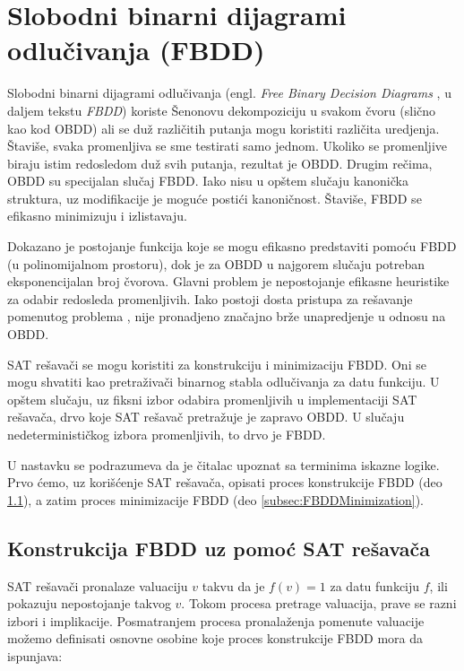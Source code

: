 \section{Slobodni binarni dijagrami odlu\v{c}ivanja (FBDD)}
\label{sec:FBDD}

Slobodni binarni dijagrami odlu\v{c}ivanja (engl. \emph{Free Binary Decision Diagrams} \cite{FBDD}, u daljem tekstu \emph{FBDD}) koriste \v{S}enonovu dekompoziciju u svakom \v{c}voru (sli\v{c}no kao kod OBDD) ali se du\v{z} razli\v{c}itih putanja mogu koristiti razli\v{c}ita uredjenja. \v{S}tavi\v{s}e, svaka promenljiva se sme testirati samo jednom. Ukoliko se promenljive biraju istim redosledom du\v{z} svih putanja, rezultat je OBDD. Drugim re\v{c}ima, OBDD su specijalan slu\v{c}aj FBDD. Iako nisu u op\v{s}tem slu\v{c}aju kanoni\v{c}ka struktura, uz modifikacije je mogu\'c{}e posti\'c{}i kanoni\v{c}nost. \v{S}tavi\v{s}e, FBDD se efikasno minimizuju i izlistavaju.

Dokazano je  postojanje funkcija koje se mogu efikasno predstaviti pomo\'c{}u FBDD (u polinomijalnom prostoru), dok je za OBDD u najgorem slu\v{c}aju potreban eksponencijalan broj \v{c}vorova. Glavni problem je nepostojanje efikasne heuristike za odabir redosleda promenljivih. Iako postoji dosta pristupa za re\v{s}avanje pomenutog problema \cite{FBDD}, nije pronadjeno zna\v{c}ajno br\v{z}e unapredjenje u odnosu na OBDD.

SAT re\v{s}ava\v{c}i se mogu koristiti za konstrukciju i minimizaciju FBDD. Oni se mogu shvatiti kao pretra\v{z}iva\v{c}i binarnog stabla odlu\v{c}ivanja za datu funkciju. U op\v{s}tem slu\v{c}aju, uz fiksni izbor odabira promenljivih u implementaciji SAT re\v{s}ava\v{c}a, drvo koje SAT re\v{s}ava\v{c} pretra\v{z}uje je zapravo OBDD. U slu\v{c}aju nedeterministi\v{c}kog izbora promenljivih, to drvo je FBDD.

U nastavku se podrazumeva da je \v{c}italac upoznat sa terminima iskazne logike. Prvo \'c{}emo, uz kori\v{s}\'c{}enje SAT re\v{s}ava\v{c}a, opisati proces konstrukcije FBDD (deo \ref{subsec:FBDDConstructionViaSAT}), a zatim proces minimizacije FBDD (deo \ref{subsec:FBDDMinimization}).


\subsection{Konstrukcija FBDD uz pomo\'c{} SAT re\v{s}ava\v{c}a}
\label{subsec:FBDDConstructionViaSAT}

SAT re\v{s}ava\v{c}i pronalaze valuaciju $v$ takvu da je $f(v) = 1$ za datu funkciju $f$, ili pokazuju nepostojanje takvog $v$. Tokom procesa pretrage valuacija, prave se razni izbori i implikacije. Posmatranjem procesa pronala\v{z}enja pomenute valuacije mo\v{z}emo definisati osnovne osobine koje proces konstrukcije FBDD mora da ispunjava:


